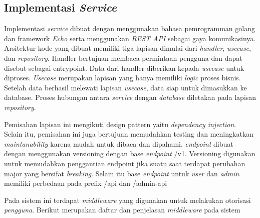\subsection{Implementasi \textit{Service}}
\label{subsec:implementasi-service}

Implementasi \textit{service} dibuat dengan menggunakan bahasa pemrogramman golang dan framework \textit{Echo} serta menggunakan \textit{REST API} sebagai gaya komunikasinya. Arsitektur kode yang dibuat memiliki tiga lapisan dimulai dari \textit{handler}, \textit{usecase}, dan \textit{repository}. Handler bertujuan membaca permintaan pengguna dan dapat disebut sebagai entrypoint. Data dari handler diberikan kepada \textit{usecase} untuk diproses. \textit{Usecase} merupakan lapisan yang hanya memiliki \textit{logic} proses bisnis. Setelah data berhasil melewati lapisan \textit{usecase}, data siap untuk dimasukkan ke database. Proses hubungan antara \textit{service} dengan \textit{database} diletakan pada lapisan \textit{repository}.

Pemisahan lapisan ini mengikuti design pattern yaitu \textit{dependency injection}. Selain itu, pemisahan ini juga bertujuan memudahkan testing dan meningkatkan \textit{maintanability} karena mudah untuk dibaca dan dipahami. \textit{endpoint} dibuat dengan menggunakan versioning dengan base \textit{endpoint} /v1. Versioning digunakan untuk memudahkan penggantian endpoint jika suatu saat terdapat perubahan major yang bersifat \textit{breaking}. Selain itu base \textit{endpoint} untuk \textit{user} dan \textit{admin} memiliki perbedaan pada prefix /api dan /admin-api

Pada sistem ini terdapat \textit{middleware} yang digunakan untuk melakukan otorisasi \textit{pengguna}. Berikut merupakan daftar dan penjelasan \textit{middleware} pada sistem


